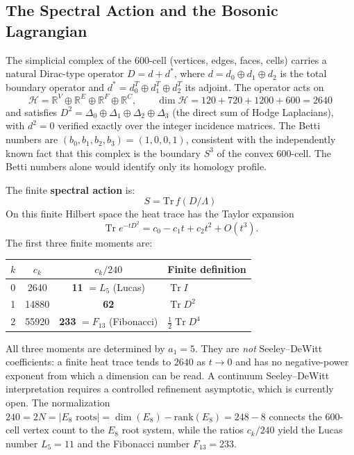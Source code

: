 \documentclass[12pt,a4paper]{article}
\theoremstyle{definition}
\begin{document}
\subsection{The Spectral Action and the Bosonic Lagrangian}
\label{sec:spectral_action}

The simplicial complex of the 600-cell (vertices, edges, faces, cells) carries a natural Dirac-type operator $D = d + d^*$, where $d = d_0 \oplus d_1 \oplus d_2$ is the total boundary operator and $d^* = d_0^T \oplus d_1^T \oplus d_2^T$ its adjoint. The operator acts on
\begin{equation}
\mathcal{H} = \mathbb{R}^V \oplus \mathbb{R}^E \oplus \mathbb{R}^F \oplus \mathbb{R}^C, \qquad \dim \mathcal{H} = 120 + 720 + 1200 + 600 = 2640
\end{equation}
and satisfies $D^2 = \Delta_0 \oplus \Delta_1 \oplus \Delta_2 \oplus \Delta_3$ (the direct sum of Hodge Laplacians), with $d^2 = 0$ verified exactly over the integer incidence matrices. The Betti numbers are $(b_0, b_1, b_2, b_3) = (1, 0, 0, 1)$, consistent with the independently known fact that this complex is the boundary $S^3$ of the convex 600-cell.  The Betti numbers alone would identify only its homology profile.

The finite \textbf{spectral action} \cite{chamseddine1997} is:
\begin{equation}
\boxed{S = \mathrm{Tr}\,f(D/\Lambda)}
\label{eq:spectral_action}
\end{equation}
On this finite Hilbert space the heat trace has the Taylor expansion
\begin{equation}
\operatorname{Tr}e^{-tD^2}=c_0-c_1t+c_2t^2+O(t^3).
\end{equation}
The first three finite moments are:
\begin{center}
\begin{tabular}{cccl}
\toprule
$k$ & $c_k$ & $c_k / 240$ & Finite definition \\
\midrule
0 & 2640 & \textbf{11} $= L_5$ (Lucas) & $\operatorname{Tr}I$ \\
1 & 14880 & \textbf{62} & $\operatorname{Tr}D^2$ \\
2 & 55920 & \textbf{233} $= F_{13}$ (Fibonacci) & $\tfrac12\operatorname{Tr}D^4$ \\
\bottomrule
\end{tabular}
\end{center}
All three moments are determined by $a_1 = 5$.  They are \emph{not}
Seeley--DeWitt coefficients: a finite heat trace tends to $2640$ as $t\to0$
and has no negative-power exponent from which a dimension can be read.  A
continuum Seeley--DeWitt interpretation requires a controlled refinement
asymptotic, which is currently open.  The normalization $240 = 2N = |E_8\text{ roots}| = \dim(E_8) - \mathrm{rank}(E_8) = 248 - 8$ connects the 600-cell vertex count to the $E_8$ root system, while the ratios $c_k/240$ yield the Lucas number $L_5 = 11$ and the Fibonacci number $F_{13} = 233$.
\end{document}
